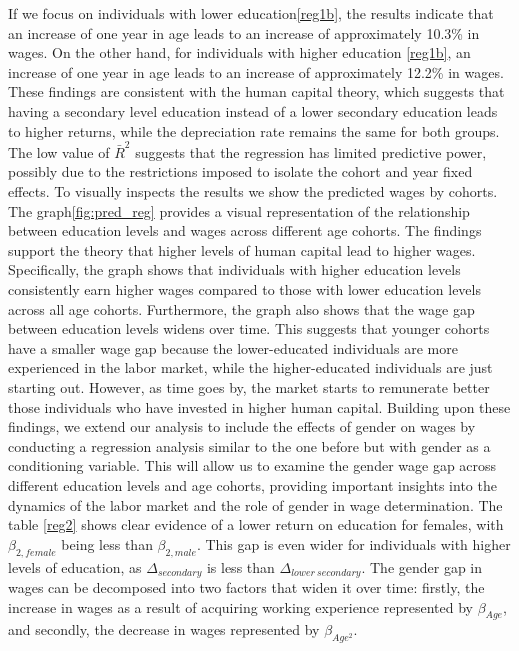 \documentclass{sistedes}
\begin{document}
If we focus on individuals with lower education\ref{reg1b}, the results indicate that an increase of one year in age leads to an increase of approximately 10.3\% in wages. On the other hand, for individuals with higher education \ref{reg1b}, an increase of one year in age leads to an increase of approximately 12.2\% in wages. These findings are consistent with the human capital theory, which suggests that having a secondary level education instead of a lower secondary education leads to higher returns, while the depreciation rate remains the same for both groups. The low value of $\bar{R}^2$ suggests that the regression has limited predictive power, possibly due to the restrictions imposed to isolate the cohort and year fixed effects.
\newline
To visually inspects the results we show the predicted
wages by cohorts.
\newline
The graph\ref{fig:pred_reg} provides a visual representation of the relationship between education levels and wages across different age cohorts. The findings support the theory that higher levels of human capital lead to higher wages. Specifically, the graph shows that individuals with higher education levels consistently earn higher wages compared to those with lower education levels across all age cohorts.
\newline
Furthermore, the graph also shows that the wage gap between education levels widens over time. This suggests that younger cohorts have a smaller wage gap because the lower-educated individuals are more experienced in the labor market, while the higher-educated individuals are just starting out. However, as time goes by, the market starts to remunerate better those individuals who have invested in higher human capital.
\newline
Building upon these findings, we extend our analysis to include the effects of gender on wages by conducting a regression analysis similar to the one before but with gender as a conditioning variable. This will allow us to examine the gender wage gap across different education levels and age cohorts, providing important insights into the dynamics of the labor market and the role of gender in wage determination.
\newline
The table \ref{reg2} shows clear evidence of a lower return on education for females, with $\beta_{2,female}$ being less than $\beta_{2,male}$. This gap is even wider for individuals with higher levels of education, as $\Delta_{secondary}$ is less than $\Delta_{lower\ secondary}$. 
The gender gap in wages can be decomposed into two factors that widen it over time: firstly, the increase in wages as a result of acquiring working experience represented by $\beta_{Age}$, and secondly, the decrease in wages represented by $\beta_{Age^2}$.
\end{document}
